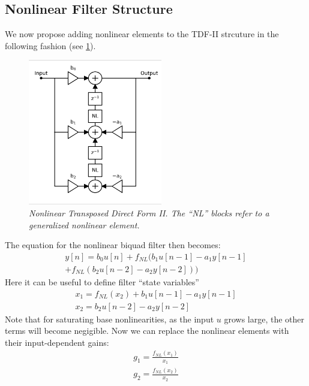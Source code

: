 \documentclass[twoside,a4paper]{article}
\begin{document}
\subsection{Nonlinear Filter Structure}
%
We now propose adding nonlinear elements to the TDF-II strcuture in the
following fashion (see \cref{NL-TDF-II}).
%
\begin{figure}[ht]
    \center
    \includegraphics[width=2.3in]{../Pics/NL-TDF-II-White.png}
    \caption{\label{NL-TDF-II}{\it Nonlinear Transposed Direct Form II.
                                The ``NL'' blocks refer to a generalized
                                nonlinear element.}}
\end{figure}
%
The equation for the nonlinear biquad filter then becomes:
%
\begin{equation}
\begin{split}
    y[n] = b_0 u[n]
         + f_{NL} (b_1 u[n-1] - a_1 y[n-1] \\
         + f_{NL} (b_2 u[n-2] - a_2 y[n-2]))
\end{split}
    \label{eq:bq_NL}
\end{equation}
%
Here it can be useful to define filter ``state variables''
%
\begin{equation}
\begin{split}
    x_1 = f_{NL} (x_2) + b_1 u[n-1] - a_1 y[n-1] \\
    x_2 = b_2 u[n-2] - a_2 y[n-2]
\end{split}
    \label{eq:states}
\end{equation}
%
Note that for saturating base nonlinearities, as the input $u$ grows large,
the other terms will become negigible.
\newline\newline
Now we can replace the nonlinear elements with their input-dependent gains:
%
\begin{equation}
\begin{split}
    g_1 =  \frac{f_{NL}(x_1)}{x_1} \\
    g_2 =  \frac{f_{NL}(x_2)}{x_2}
\end{split}
    \label{eq:gs}
\end{equation}
\end{document}
